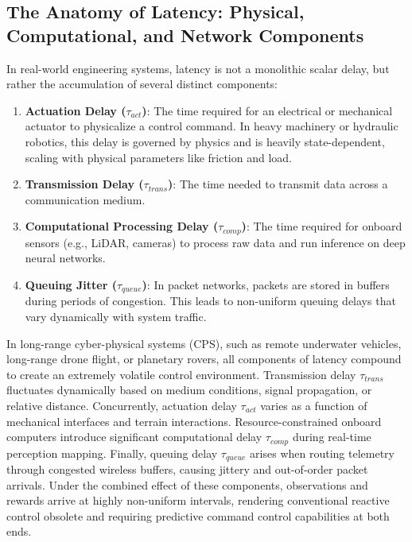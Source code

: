\documentclass[manuscript, screen, review]{jair}
\begin{document}
\subsection{The Anatomy of Latency: Physical, Computational, and Network Components}
In real-world engineering systems, latency is not a monolithic scalar delay, but rather the accumulation of several distinct components:
\begin{enumerate}
    \item \textbf{Actuation Delay ($\tau_{act}$)}: The time required for an electrical or mechanical actuator to physicalize a control command. In heavy machinery or hydraulic robotics, this delay is governed by physics and is heavily state-dependent, scaling with physical parameters like friction and load.
    \item \textbf{Transmission Delay ($\tau_{trans}$)}: The time needed to transmit data across a communication medium. 
    \item \textbf{Computational Processing Delay ($\tau_{comp}$)}: The time required for onboard sensors (e.g., LiDAR, cameras) to process raw data and run inference on deep neural networks.
    \item \textbf{Queuing Jitter ($\tau_{queue}$)}: In packet networks, packets are stored in buffers during periods of congestion. This leads to non-uniform queuing delays that vary dynamically with system traffic.
\end{enumerate}
In long-range cyber-physical systems (CPS), such as remote underwater vehicles, long-range drone flight, or planetary rovers, all components of latency compound to create an extremely volatile control environment. Transmission delay $\tau_{trans}$ fluctuates dynamically based on medium conditions, signal propagation, or relative distance. Concurrently, actuation delay $\tau_{act}$ varies as a function of mechanical interfaces and terrain interactions. Resource-constrained onboard computers introduce significant computational delay $\tau_{comp}$ during real-time perception mapping. Finally, queuing delay $\tau_{queue}$ arises when routing telemetry through congested wireless buffers, causing jittery and out-of-order packet arrivals. Under the combined effect of these components, observations and rewards arrive at highly non-uniform intervals, rendering conventional reactive control obsolete and requiring predictive command control capabilities at both ends.
\end{document}
